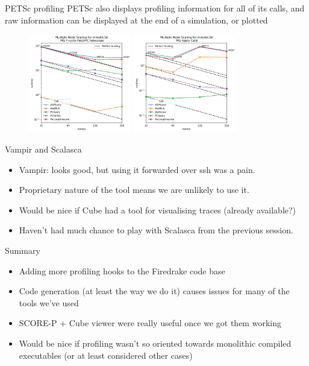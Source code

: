\documentclass[pdf,aspectratio=169]{beamer}
\begin{document}
\begin{frame}{PETSc profiling}
PETSc also displays profiling information for all of its calls, and raw information can be displayed at the end of a simulation, or plotted
\begin{figure}
	\includegraphics[width=0.4\textwidth]{main_stage.png}
	\includegraphics[width=0.4\textwidth]{mgapply.png}
\end{figure}
\end{frame}

\begin{frame}{Vampir and Scalasca}
\begin{itemize}
	\item Vampir: looks good, but using it forwarded over ssh was a pain.
	\item Proprietary nature of the tool means we are unlikely to use it.
	\item Would be nice if Cube had a tool for visualising traces (already available?)
	\item Haven't had much chance to play with Scalasca from the previous session.
\end{itemize}
\end{frame}

\begin{frame}{Summary}
\begin{itemize}
	\item Adding more profiling hooks to the Firedrake code base
	\item Code generation (at least the way we do it) causes issues for many of the tools we've used
	\item SCORE-P + Cube viewer were really useful once we got them working
	\item Would be nice if profiling wasn't so oriented towards monolithic compiled executables (or at least considered other cases)
\end{itemize}
\end{frame}
\end{document}
